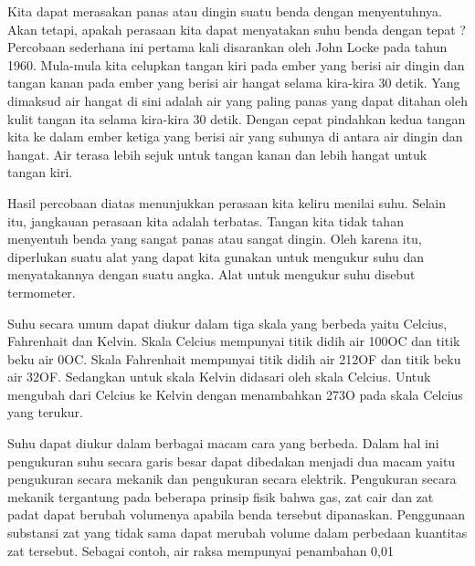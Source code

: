 \documentclass{jtetiproposalskripsi}
\begin{document}
	
Kita dapat merasakan panas atau dingin suatu benda dengan menyentuhnya. Akan tetapi, apakah perasaan kita dapat menyatakan suhu benda dengan tepat ? Percobaan sederhana ini pertama kali disarankan oleh John Locke pada tahun 1960. Mula-mula kita celupkan tangan kiri pada ember yang berisi air dingin dan tangan kanan pada ember yang berisi air hangat selama kira-kira 30 detik. Yang dimaksud air hangat di sini adalah air yang paling panas yang dapat ditahan oleh kulit tangan ita selama kira-kira 30 detik. Dengan cepat pindahkan kedua tangan kita ke dalam ember ketiga yang berisi air yang suhunya di antara air dingin dan hangat. Air terasa lebih sejuk untuk tangan kanan dan lebih hangat untuk tangan kiri.
	
	
	
Hasil percobaan diatas menunjukkan perasaan kita keliru menilai suhu. Selain itu, jangkauan perasaan kita adalah terbatas. Tangan kita tidak tahan menyentuh benda yang sangat panas atau sangat dingin. Oleh karena itu, diperlukan suatu alat yang dapat kita gunakan untuk mengukur suhu dan menyatakannya dengan suatu angka. Alat untuk mengukur suhu disebut termometer.
	
	
	
Suhu secara umum dapat diukur dalam tiga skala yang berbeda yaitu Celcius, Fahrenhait dan Kelvin. Skala Celcius mempunyai titik didih air 100OC dan titik beku air 0OC. Skala Fahrenhait mempunyai titik didih air 212OF dan titik beku air 32OF. Sedangkan untuk skala Kelvin didasari oleh skala Celcius. Untuk mengubah dari Celcius ke Kelvin dengan menambahkan 273O pada skala Celcius yang terukur.
	
	
	
Suhu dapat diukur dalam berbagai macam cara yang berbeda. Dalam hal ini pengukuran suhu secara garis besar dapat dibedakan menjadi dua macam yaitu pengukuran secara mekanik dan pengukuran secara elektrik. Pengukuran secara mekanik tergantung pada beberapa prinsip fisik bahwa gas, zat cair dan zat padat dapat berubah volumenya apabila benda tersebut dipanaskan. Penggunaan substansi zat yang tidak sama dapat merubah volume dalam perbedaan kuantitas zat tersebut. Sebagai contoh, air raksa mempunyai penambahan 0,01%
	
\end{document}
